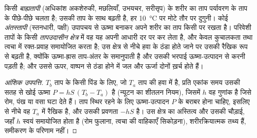 \begin{proposition}[अंतस्तापी और बाह्यतापी]\label{prop:b1:organism-environment:thermo}
किसी \emph{बाह्यतापी}  (अधिकांश अकशेरुकी, मछलियाँ,
उभयचर, सरीसृप) के शरीर का ताप पर्यावरण के ताप के पीछे-पीछे चलता है; उसकी
 ताप के साथ बढ़ती है, हर \qty{10}{\celsius} पर मोटे तौर पर
दुगुनी। कोई \emph{अंतस्तापी}  (स्तनधारी, पक्षी)
उपापचय से ऊष्मा बनाकर अपने शरीर का ताप किसी  पर रखता है।
परिवेशी तापों के किसी \emph{तापउदासीन क्षेत्र}
में वह यह अपनी आधारी दर पर कर लेता है, और केवल कुचालकता तथा त्वचा में
रक्त-प्रवाह समायोजित करता है; उस क्षेत्र से नीचे हवा के ठंडा होते जाने पर
उसकी  रैखिक रूप से बढ़ती है, क्योंकि ऊष्मा-ह्रास ताप-अंतर के
समानुपाती है और उसकी भरपाई ऊष्मा-उत्पादन से करनी पड़ती है; और उससे ऊपर,
वाष्पन से ठंडा होने में जल और ऊर्जा दोनों ख़र्च होते हैं।
\end{proposition}
\begin{proof}[आंशिक उपपत्ति]
$T_b$ ताप के किसी पिंड के लिए, जो $T_a$ ताप की हवा में है, प्रति एकांक
समय उसकी सतह से खोई ऊष्मा $P = hS\,(T_b - T_a)$ है (न्यूटन का शीतलन नियम), जिसमें
$h$ वह गुणांक है जिसे रोम, पंख या वसा घटा देते हैं। ताप स्थिर रहने के
लिए ऊष्मा-उत्पादन $P$ के बराबर होना चाहिए, इसलिए  से
नीचे वह $T_a$ में रैखिक है, और उसकी प्रवणता $-hS$ है। उस क्षेत्र का
अस्तित्व और उसकी चौड़ाई, जहाँ $h$ स्वयं समायोजित होता है (रोम फुलाना,
त्वचा की वाहिकाएँ सिकोड़ना), शरीरक्रियात्मक तथ्य हैं, समीकरण के परिणाम
नहीं।
\end{proof}

